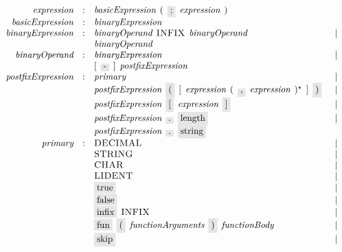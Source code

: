 \begin{figure}[h]
  \[
    \begin{array}{rcll}
      \defterm{expression}        & : & \nonterm{basicExpression}\s(\s\term{;}\s\nonterm{expression}\s)&\\
      \defterm{basicExpression}   & : & \nonterm{binaryExpression}&\\
      \defterm{binaryExpression}  & : & \nonterm{binaryOperand}\s\token{INFIX}\s\nonterm{binaryOperand}&\alt\\
                                  &   & \nonterm{binaryOperand}&\\
      \defterm{binaryOperand}     & : & \nonterm{binaryExpression}&\alt\\
                                  &   & [\s\term{-}\s]\s\nonterm{postfixExpression}&\\
      \defterm{postfixExpression} & : & \nonterm{primary}&\alt\\
                                  &   & \nonterm{postfixExpression}\s\term{(}\s[\s\nonterm{expression}\s(\s\term{,}\s\nonterm{expression}\s)^\star\s]\s\term{)}&\alt\\
                                  &   & \nonterm{postfixExpression}\s\term{[}\s\nonterm{expression}\s\term{]}&\alt\\
                                  &   & \nonterm{postfixExpression}\s\term{.}\s\term{length}&\alt\\
                                  &   & \nonterm{postfixExpression}\s\term{.}\s\term{string}&\\      
      \defterm{primary}           & : & \token{DECIMAL}&\alt\\
                                  &   & \token{STRING}&\alt\\
                                  &   & \token{CHAR}&\alt\\
                                  &   & \token{LIDENT}&\alt\\
                                  &   & \term{true}&\alt\\
                                  &   & \term{false}&\alt\\
                                  &   & \term{infix}\s\token{INFIX}&\alt\\
                                  &   & \term{fun}\s\term{(}\s\nonterm{functionArguments}\s\term{)}\s\nonterm{functionBody}&\alt\\
                                  &   & \term{skip}&\alt\\

\end{array}\]
\end{figure}
